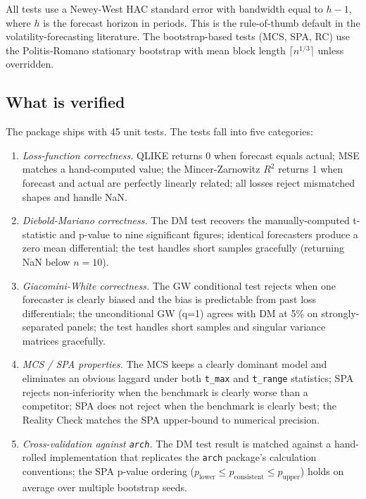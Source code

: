 All tests use a Newey-West HAC standard error with bandwidth equal to $h-1$, where $h$ is the forecast horizon in periods. This is the rule-of-thumb default in the volatility-forecasting literature. The bootstrap-based tests (MCS, SPA, RC) use the Politis-Romano stationary bootstrap with mean block length $\lceil n^{1/3}\rceil$ unless overridden.

\subsection{What is verified}

The package ships with 45 unit tests. The tests fall into five categories:

\begin{enumerate}[leftmargin=*]
    \item \textit{Loss-function correctness.} QLIKE returns 0 when forecast equals actual; MSE matches a hand-computed value; the Mincer-Zarnowitz $R^2$ returns 1 when forecast and actual are perfectly linearly related; all losses reject mismatched shapes and handle NaN.
    \item \textit{Diebold-Mariano correctness.} The DM test recovers the manually-computed t-statistic and p-value to nine significant figures; identical forecasters produce a zero mean differential; the test handles short samples gracefully (returning NaN below $n=10$).
    \item \textit{Giacomini-White correctness.} The GW conditional test rejects when one forecaster is clearly biased and the bias is predictable from past loss differentials; the unconditional GW (q=1) agrees with DM at 5\% on strongly-separated panels; the test handles short samples and singular variance matrices gracefully.
    \item \textit{MCS / SPA properties.} The MCS keeps a clearly dominant model and eliminates an obvious laggard under both \texttt{t\_max} and \texttt{t\_range} statistics; SPA rejects non-inferiority when the benchmark is clearly worse than a competitor; SPA does not reject when the benchmark is clearly best; the Reality Check matches the SPA upper-bound to numerical precision.
    \item \textit{Cross-validation against \texttt{arch}.} The DM test result is matched against a hand-rolled implementation that replicates the \texttt{arch} package's calculation conventions; the SPA p-value ordering ($p_{\text{lower}} \le p_{\text{consistent}} \le p_{\text{upper}}$) holds on average over multiple bootstrap seeds.
\end{enumerate}

